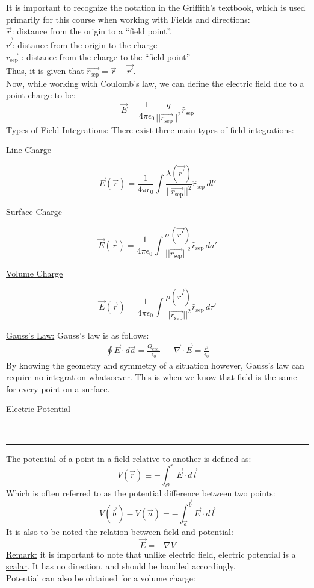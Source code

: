 \documentclass{article}
\newcommand{\sepvec}{\vec{r_\textrm{sep}}}
\newcommand{\sephat}{\hat{r}_{\textrm{sep}}}
\newcommand{\header}[1]{\begin{large}\noindent #1\end{large}\\\rule{\textwidth}{0.5pt}}
\newcommand{\gap}{\medskip\\}
\newcommand{\centertext}[1]{\begin{center}#1\end{center}}
\newcommand{\sheader}[1]{\underline{#1:}}
\newcommand{\sgap}{\smallskip\\}
\begin{document}
It is important to recognize the notation in the Griffith's textbook, which is used
primarily for this course when working with Fields and directions:
\sgap
$\vec{r}$: distance from the origin to a ``field point''.\\
$\vec{r'}$: distance from the origin to the charge\\
$\sepvec$ : distance from the charge to the ``field point''\\
Thus, it is given that $\sepvec = \vec{r} - \vec{r'}$.
\gap
Now, while working with Coulomb's law, we can define the electric field due to a point charge to be:
\[
    \vec{E} = \frac{1}{4\pi \epsilon_0} \frac{q}{||\sepvec||^2}\sephat    
\]
\sheader{Types of Field Integrations} There exist three main types of field integrations:
\begin{multicols}{3}
    \centertext{\underline{Line Charge}}
    \[
        \vec{E}(\vec{r}) = \frac{1}{4 \pi \epsilon_0}\int{\frac{\lambda(\vec{r'})}{||\sepvec||^2}\sephat \, dl'}    
    \]
    \vfill\null\columnbreak
    \centertext{\underline{Surface Charge}}
    \[
        \vec{E}(\vec{r}) = \frac{1}{4\pi\epsilon_0}\int{\frac{\sigma(\vec{r'})}{||\sepvec||^2}\sephat \, da'}    
    \]
    \vfill\null\columnbreak
    \centertext{\underline{Volume Charge}}
    \[
        \vec{E}(\vec{r}) = \frac{1}{4\pi\epsilon_0}\int{\frac{\rho(\vec{r'})}{||\sepvec||^2}\sephat \, d\tau'}    
    \]
    \vfill\null
\end{multicols}
\sheader{Gauss's Law} Gauss's law is as follows:
\begin{align*}
    \oint{\vec{E} \cdot d\vec{a}} = \frac{Q_\textrm{encl}}{\epsilon_0} && \vec{\nabla} \cdot \vec{E} = \frac{\rho}{\epsilon_0}
\end{align*}
By knowing the geometry and symmetry of a situation however, Gauss's law can require
no integration whatsoever. This is when we know that field is the same for every point
on a surface. 
\gap
\header{Electric Potential}
The potential of a point in a field relative to another is defined as:
\[
    V(\vec{r}) \equiv - \int_{\mathcal{O}}^r \vec{E} \cdot d\vec{l}    
\]
Which is often referred to as the potential difference between two points:
\[
    V(\vec{b}) - V(\vec{a}) = - \int_{\vec{a}}^{\vec{b}}{\vec{E} \cdot d\vec{l}}
\]
It is also to be noted the relation between field and potential:
\[
    \vec{E} = - \nabla V    
\]
\sheader{Remark} it is important to note that unlike electric field, electric potential
is a \underline{scalar}. It has no direction, and should be handled accordingly.
\gap
Potential can also be obtained for a volume charge:
\end{document}
